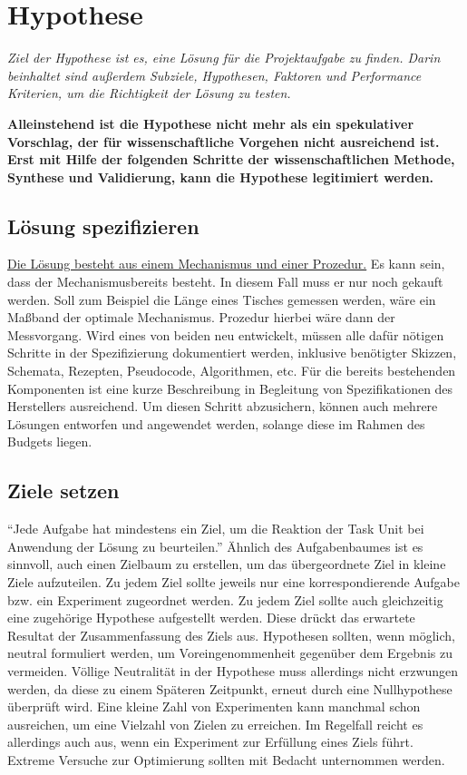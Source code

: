 \section{Hypothese} \label{chap:hypothese}

\textit{Ziel der Hypothese ist es, eine Lösung für die Projektaufgabe zu finden. Darin beinhaltet 
sind außerdem Subziele, Hypothesen, Faktoren und Performance Kriterien, um die Richtigkeit der 
Lösung zu testen.}

\textbf{Alleinstehend ist die Hypothese nicht mehr als ein spekulativer Vorschlag, der für wissenschaftliche 
Vorgehen nicht ausreichend ist. Erst mit Hilfe der folgenden Schritte der wissenschaftlichen Methode, 
Synthese und Validierung, kann die Hypothese legitimiert werden.}

    \subsection{Lösung spezifizieren}

    \underline{Die Lösung besteht aus einem Mechanismus und einer Prozedur.} Es kann sein, dass 
    der Mechanismusbereits besteht. In diesem Fall muss er nur noch gekauft werden. Soll zum Beispiel 
    die Länge 
    eines Tisches gemessen werden, wäre ein Maßband der optimale Mechanismus. Prozedur hierbei 
    wäre dann der Messvorgang. Wird eines von beiden neu entwickelt, müssen alle dafür nötigen 
    Schritte in der Spezifizierung dokumentiert werden, inklusive benötigter Skizzen, Schemata, 
    Rezepten, Pseudocode, Algorithmen, etc. Für die bereits bestehenden Komponenten ist eine kurze
    Beschreibung in Begleitung von Spezifikationen des Herstellers ausreichend. 
    Um diesen Schritt abzusichern, können auch mehrere Lösungen entworfen und angewendet werden, 
    solange diese im Rahmen des Budgets liegen.

    \subsection{Ziele setzen}

    \enquote{Jede Aufgabe hat mindestens ein Ziel, um die Reaktion der Task Unit bei Anwendung der 
    Lösung zu beurteilen.} Ähnlich des Aufgabenbaumes ist es sinnvoll, auch einen Zielbaum zu erstellen, um 
    das übergeordnete Ziel in kleine Ziele aufzuteilen. Zu jedem Ziel sollte jeweils nur eine 
    korrespondierende Aufgabe bzw. ein Experiment zugeordnet werden.
    Zu jedem Ziel sollte auch gleichzeitig eine zugehörige Hypothese aufgestellt werden. Diese 
    drückt das erwartete Resultat der Zusammenfassung des Ziels aus. Hypothesen sollten, wenn 
    möglich, neutral formuliert werden, um Voreingenommenheit gegenüber dem Ergebnis zu vermeiden. 
    Völlige Neutralität in der Hypothese muss allerdings nicht erzwungen werden, da diese zu einem 
    Späteren Zeitpunkt, erneut durch eine Nullhypothese überprüft wird. 
    Eine kleine Zahl von Experimenten kann manchmal schon ausreichen, um eine Vielzahl von Zielen 
    zu erreichen. Im Regelfall reicht es allerdings auch aus, wenn ein Experiment zur Erfüllung 
    eines Ziels führt. Extreme Versuche zur Optimierung  sollten mit Bedacht unternommen werden.


